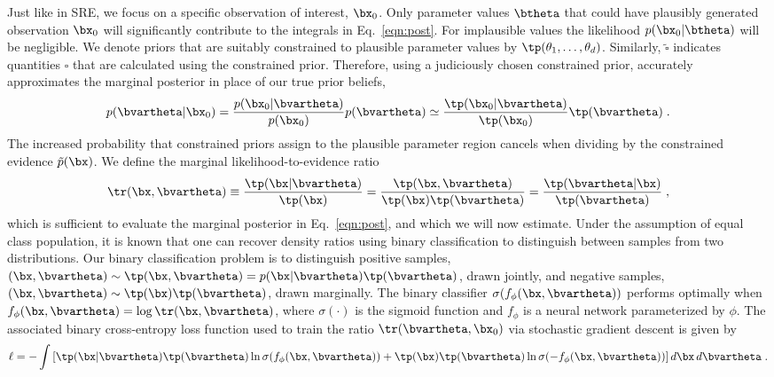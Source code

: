 Just like in SRE, we focus on a specific observation of interest, $\bx_0$.  
Only parameter values $\btheta$ 
that could have plausibly generated observation $\bx_0$
will significantly contribute to the integrals in Eq.~\eqref{eqn:post}. For implausible values the likelihood $p(\bx_0|\btheta)$ will be negligible.  We denote priors that are suitably constrained to plausible parameter values by $\tp(\theta_1, \dots, \theta_d)$. Similarly, $\tilde{\square}$ indicates quantities $\square$ that are calculated using the constrained prior. Therefore, using a judiciously chosen constrained prior, accurately approximates the marginal posterior in place of our true prior beliefs,
\begin{equation}
p(\bvartheta | \bx_0) =  
\frac{p(\bx_0|\bvartheta)}{p(\bx_0)} p(\bvartheta) \simeq
\frac{\tp(\bx_0|\bvartheta)}{\tp(\bx_0)} \tp(\bvartheta)\;.
\end{equation}
The increased probability that constrained priors assign to the plausible parameter region cancels when dividing by the constrained evidence $\tilde p(\bx)$. We define the marginal likelihood-to-evidence ratio
\begin{equation}
	\label{eqn:likelihood_ratio}
	\tr(\bx, \bvartheta) 
	\equiv \frac{\tp(\bx \vert \bvartheta)}{\tp(\bx)} 
	= \frac{\tp(\bx, \bvartheta)}{\tp(\bx) \tp(\bvartheta)} 
	= \frac{\tp(\bvartheta \vert\bx )}{\tp(\bvartheta)}\;,
\end{equation}
which is sufficient to evaluate the marginal posterior in Eq.~\eqref{eqn:post}, and which we will now estimate.
%
Under the assumption of equal class population, it is known \cite{Durkan2020, Cranmer2015} that one can recover density ratios using binary classification to distinguish between samples from two distributions.  Our binary classification problem is to distinguish positive samples,
$(\bx, \bvartheta) \sim \tp(\bx, \bvartheta) = p(\bx \vert \bvartheta) \tp(\bvartheta)$, drawn jointly, and negative samples, $(\bx, \bvartheta) \sim \tp(\bx) \tp(\bvartheta)$, drawn marginally. 
%
The binary classifier $\sigma(f_{\phi}(\bx, \bvartheta))$ performs optimally when $f_{\phi}(\bx, \bvartheta) = \log \tr(\bx, \bvartheta)$, where $\sigma(\cdot)$ is the sigmoid function and $f_{\phi}$ is a neural network parameterized by $\phi$.  The associated binary cross-entropy loss function used to train the ratio $\tr(\bvartheta, \bx_0)$ via stochastic gradient descent is given by 
%
\begin{equation}
    \ell = -\int \left[ \tp(\bx|\bvartheta)\tp(\bvartheta) \ln \sigma(f_\phi(\bx, \bvartheta)) + \tp(\bx)\tp(\bvartheta) \ln \sigma(-f_\phi(\bx,\bvartheta)) \right] d\bx\, d\bvartheta\;.
\end{equation}

